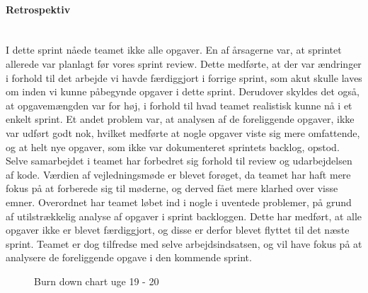 \documentclass[../../main.tex]{subfiles}
\begin{document}
\paragraph{Retrospektiv}\mbox{}\\
I dette sprint nåede teamet ikke alle opgaver. En af årsagerne var, at sprintet allerede var planlagt før vores sprint review. Dette medførte, at der var ændringer i forhold til det arbejde vi havde færdiggjort i forrige sprint, som akut skulle laves om inden vi kunne påbegynde opgaver i dette sprint. Derudover skyldes det også, at opgavemængden var for høj, i forhold til hvad teamet realistisk kunne nå i et enkelt sprint. Et andet problem var, at analysen af de foreliggende opgaver, ikke var udført godt nok, hvilket medførte at nogle opgaver viste sig mere omfattende, og at helt nye opgaver, som ikke var dokumenteret  sprintets backlog, opstod. 
Selve samarbejdet i teamet har forbedret sig forhold til review og udarbejdelsen af kode. Værdien af vejledningsmøde er blevet forøget, da teamet har haft mere fokus på at forberede sig til møderne, og derved fået mere klarhed over visse emner.
Overordnet har teamet løbet ind i nogle i uventede problemer, på grund af utilstrækkelig analyse af opgaver i sprint backloggen. Dette har medført, at alle opgaver ikke er blevet færdiggjort, og disse er derfor blevet flyttet til det næste sprint. Teamet er dog tilfredse med selve arbejdsindsatsen, og vil have fokus på at analysere de foreliggende opgave i den kommende sprint.       


\begin{center}
\begin{figure}[H]
\footnotesize
\centering
{}
    \caption{Burn down chart uge 19 - 20}
    \label{fig:burn_down_19_20}
\end{figure}
\end{center}
\end{document}
